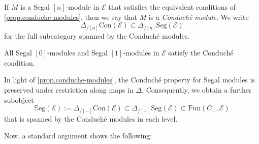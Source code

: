 \documentclass[a4paper, 11pt]{amsart}
\numberwithin{theorem}{section}
\theoremstyle{definition}
\newcommand{\fun}{\mathrm{Fun}}
\newcommand{\E}{\mathscr{E}}
\newcommand{\Seg}{\mathrm{Seg}}
\newcommand{\Con}{\mathrm{Con}}
\newcommand{\SSEG}{\mathbb{S}\mathrm{eg}}
\begin{document}
\begin{definition}
	If $M$ is a Segal $[n]$-module in $\E$ that satisfies the equivalent conditions of \cref{prop.conduche-modules}, 
	then we say that $M$ is a \textit{Conduch\'e module}. We write $$\Delta_{/[n]}\Con(\E) \subset {\Delta_{/[n]}}\Seg(\E)$$ for the full subcategory spanned by 
	the Conduch\'e modules.
\end{definition}

\begin{corollary}
	All Segal $[0]$-modules and Segal $[1]$-modules in $\E$ satisfy the Conduch\'e condition.
\end{corollary}


\begin{construction}
	In light of \cref{prop.conduche-modules}, the Conduch\'e property for Segal modules is preserved under 
	restriction along maps in $\Delta$. Consequently, we obtain a further subobject 
	$$
	\SSEG(\E) := \Delta_{/[-]}\Con(\E) \subset \Delta_{/[-]}\Seg(\E) \subset \fun(C_-, \E)
	$$
	that is spanned by the Conduch\'e modules in each level.
\end{construction}

Now, a standard argument shows the following:
\end{document}
